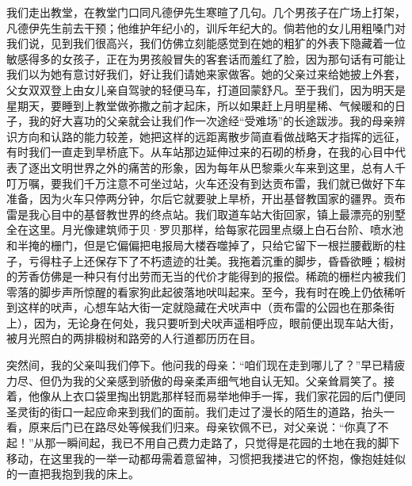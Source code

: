\par 我们走出教堂，在教堂门口同凡德伊先生寒暄了几句。几个男孩子在广场上打架，凡德伊先生前去干预；他维护年纪小的，训斥年纪大的。倘若他的女儿用粗嗓门对我们说，见到我们很高兴，我们仿佛立刻能感觉到在她的粗犷的外表下隐藏着一位敏感得多的女孩子，正在为男孩般冒失的客套话而羞红了脸，因为那句话有可能让我们以为她有意讨好我们，好让我们请她来家做客。她的父亲过来给她披上外套，父女双双登上由女儿亲自驾驶的轻便马车，打道回蒙舒凡。至于我们，因为明天是星期天，要睡到上教堂做弥撒之前才起床，所以如果赶上月明星稀、气候暖和的日子，我的好大喜功的父亲就会让我们作一次途经“受难场”的长途跋涉。我的母亲辨识方向和认路的能力较差，她把这样的远距离散步简直看做战略天才指挥的远征，有时我们一直走到旱桥底下。从车站那边延伸过来的石砌的桥身，在我的心目中代表了逐出文明世界之外的痛苦的形象，因为每年从巴黎乘火车来到这里，总有人千叮万嘱，要我们千万注意不可坐过站，火车还没有到达贡布雷，我们就已做好下车准备，因为火车只停两分钟，尔后它就要驶上旱桥，开出基督教国家的疆界。贡布雷是我心目中的基督教世界的终点站。我们取道车站大街回家，镇上最漂亮的别墅全在这里。月光像建筑师于贝·罗贝那样，给每家花园里点缀上白石台阶、喷水池和半掩的栅门，但是它偏偏把电报局大楼吞噬掉了，只给它留下一根拦腰截断的柱子，亏得柱子上还保存下了不朽遗迹的壮美。我拖着沉重的脚步，昏昏欲睡；椴树的芳香仿佛是一种只有付出劳而无当的代价才能得到的报偿。稀疏的栅栏内被我们零落的脚步声所惊醒的看家狗此起彼落地吠叫起来。至今，我有时在晚上仍依稀听到这样的吠声，心想车站大街一定就隐藏在犬吠声中（贡布雷的公园也在那条街上），因为，无论身在何处，我只要听到犬吠声遥相呼应，眼前便出现车站大街，被月光照白的两排椴树和路旁的人行道都历历在目。
\par 突然间，我的父亲叫我们停下。他问我的母亲：“咱们现在走到哪儿了？”早已精疲力尽、但仍为我的父亲感到骄傲的母亲柔声细气地自认无知。父亲耸肩笑了。接着，他像从上衣口袋里掏出钥匙那样轻而易举地伸手一挥，我们家花园的后门便同圣灵街的街口一起应命来到我们的面前。我们走过了漫长的陌生的道路，抬头一看，原来后门已在路尽处等候我们归来。母亲钦佩不已，对父亲说：“你真了不起！”从那一瞬间起，我已不用自己费力走路了，只觉得是花园的土地在我的脚下移动，在这里我的一举一动都毋需着意留神，习惯把我搂进它的怀抱，像抱娃娃似的一直把我抱到我的床上。
